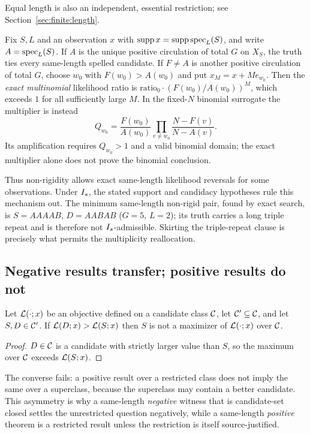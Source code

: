 Equal length is also an independent, essential restriction; see
Section~\ref{sec:finite:length}.

\begin{proposition}
\label{prop:beatability}
Fix $S,L$ and an observation $x$ with $\operatorname{supp} x=\operatorname{supp}\operatorname{spec}_L(S)$, and write
$A=\operatorname{spec}_L(S)$. If $A$ is the unique positive circulation of total $G$ on
$X_S$, the truth ties every same-length spelled candidate. If $F\ne A$ is
another positive circulation of total $G$, choose $w_0$ with $F(w_0)>A(w_0)$ and
put $x_M=x+M e_{w_0}$. Then the \emph{exact multinomial} likelihood ratio is
$\mathrm{ratio}_0\cdot(F(w_0)/A(w_0))^M$, which exceeds $1$ for
all sufficiently large $M$. In the fixed-$N$ binomial surrogate the
multiplier is instead
\[
Q_{w_0}=\frac{F(w_0)}{A(w_0)}
\prod_{v\ne w_0}\frac{N-F(v)}{N-A(v)}.
\]
Its amplification requires $Q_{w_0}>1$ and a valid binomial domain;
the exact multiplier alone does not prove the binomial conclusion.
\end{proposition}

Thus non-rigidity allows exact same-length likelihood reversals for
some observations. Under $I_s$, the stated support and candidacy
hypotheses rule this mechanism out. The minimum
same-length non-rigid pair, found by exact search, is $S=AAAAB$,
$D=AABAB$ ($G=5$, $L=2$); its truth carries a long triple repeat and is
therefore not $I_s$-admissible. Skirting the triple-repeat clause is precisely
what permits the multiplicity reallocation.

\subsection{Negative results transfer; positive results do not}

\begin{lemma}
\label{lem:negative-transfer}
Let $\mathcal{L}(\cdot;x)$ be an objective defined on a candidate class $\mathcal{C}$, let
$\mathcal{C}'\subseteq\mathcal{C}$, and let $S,D\in\mathcal{C}'$. If
$\mathcal{L}(D;x) > \mathcal{L}(S;x)$ then $S$ is not a maximizer of $\mathcal{L}(\cdot;x)$ over
$\mathcal{C}$.
\end{lemma}

\begin{proof}
$D\in\mathcal{C}$ is a candidate with strictly larger value than $S$, so the maximum
over $\mathcal{C}$ exceeds $\mathcal{L}(S;x)$.
\end{proof}

The converse fails: a positive result over a restricted class does not imply the
same over a superclass, because the superclass may contain a better candidate.
This asymmetry is why a same-length \emph{negative} witness that is
candidate-set closed settles the unrestricted question negatively, while a
same-length \emph{positive} theorem is a restricted result unless the restriction
is itself source-justified.

